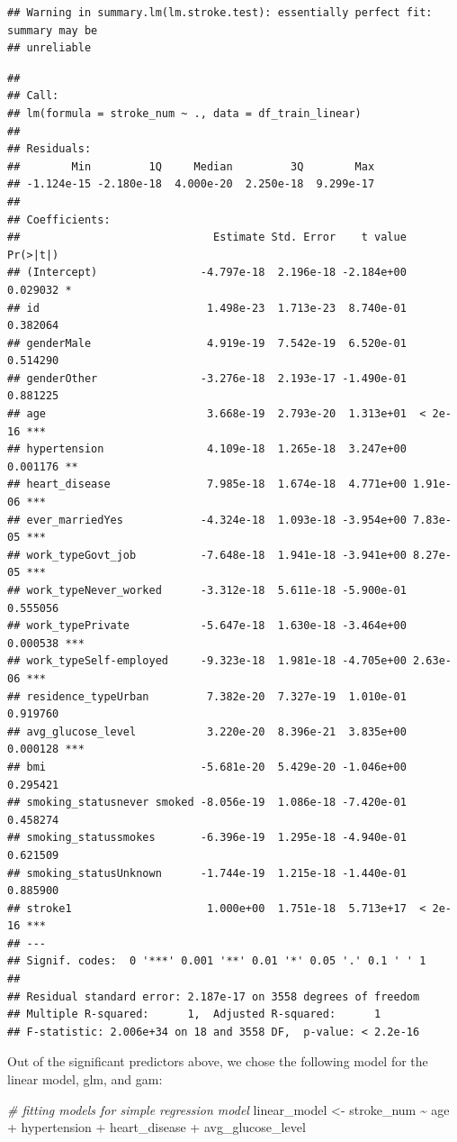 \documentclass[
]{article}
\newenvironment{Shaded}{\begin{snugshade}}{\end{snugshade}}
\newcommand{\CommentTok}[1]{\textcolor[rgb]{0.56,0.35,0.01}{\textit{#1}}}
\newcommand{\NormalTok}[1]{#1}
\newcommand{\OtherTok}[1]{\textcolor[rgb]{0.56,0.35,0.01}{#1}}
\newcommand{\SpecialCharTok}[1]{\textcolor[rgb]{0.00,0.00,0.00}{#1}}
\renewcommand{\=}[1]{\stackrel{#1}{=}}
\theoremstyle{definition}
\theoremstyle{remark}
\begin{document}
\begin{verbatim}
## Warning in summary.lm(lm.stroke.test): essentially perfect fit: summary may be
## unreliable
\end{verbatim}

\begin{verbatim}
## 
## Call:
## lm(formula = stroke_num ~ ., data = df_train_linear)
## 
## Residuals:
##        Min         1Q     Median         3Q        Max 
## -1.124e-15 -2.180e-18  4.000e-20  2.250e-18  9.299e-17 
## 
## Coefficients:
##                              Estimate Std. Error    t value Pr(>|t|)    
## (Intercept)                -4.797e-18  2.196e-18 -2.184e+00 0.029032 *  
## id                          1.498e-23  1.713e-23  8.740e-01 0.382064    
## genderMale                  4.919e-19  7.542e-19  6.520e-01 0.514290    
## genderOther                -3.276e-18  2.193e-17 -1.490e-01 0.881225    
## age                         3.668e-19  2.793e-20  1.313e+01  < 2e-16 ***
## hypertension                4.109e-18  1.265e-18  3.247e+00 0.001176 ** 
## heart_disease               7.985e-18  1.674e-18  4.771e+00 1.91e-06 ***
## ever_marriedYes            -4.324e-18  1.093e-18 -3.954e+00 7.83e-05 ***
## work_typeGovt_job          -7.648e-18  1.941e-18 -3.941e+00 8.27e-05 ***
## work_typeNever_worked      -3.312e-18  5.611e-18 -5.900e-01 0.555056    
## work_typePrivate           -5.647e-18  1.630e-18 -3.464e+00 0.000538 ***
## work_typeSelf-employed     -9.323e-18  1.981e-18 -4.705e+00 2.63e-06 ***
## residence_typeUrban         7.382e-20  7.327e-19  1.010e-01 0.919760    
## avg_glucose_level           3.220e-20  8.396e-21  3.835e+00 0.000128 ***
## bmi                        -5.681e-20  5.429e-20 -1.046e+00 0.295421    
## smoking_statusnever smoked -8.056e-19  1.086e-18 -7.420e-01 0.458274    
## smoking_statussmokes       -6.396e-19  1.295e-18 -4.940e-01 0.621509    
## smoking_statusUnknown      -1.744e-19  1.215e-18 -1.440e-01 0.885900    
## stroke1                     1.000e+00  1.751e-18  5.713e+17  < 2e-16 ***
## ---
## Signif. codes:  0 '***' 0.001 '**' 0.01 '*' 0.05 '.' 0.1 ' ' 1
## 
## Residual standard error: 2.187e-17 on 3558 degrees of freedom
## Multiple R-squared:      1,  Adjusted R-squared:      1 
## F-statistic: 2.006e+34 on 18 and 3558 DF,  p-value: < 2.2e-16
\end{verbatim}

Out of the significant predictors above, we chose the following model for the linear model, glm, and gam:

\begin{Shaded}
\begin{Highlighting}[]
\CommentTok{\# fitting models for simple regression model}
\NormalTok{linear\_model }\OtherTok{\textless{}{-}}\NormalTok{ stroke\_num }\SpecialCharTok{\textasciitilde{}}\NormalTok{ age }\SpecialCharTok{+}\NormalTok{ hypertension }\SpecialCharTok{+}\NormalTok{ heart\_disease }\SpecialCharTok{+}\NormalTok{ avg\_glucose\_level}
\end{Highlighting}
\end{Shaded}
\end{document}
